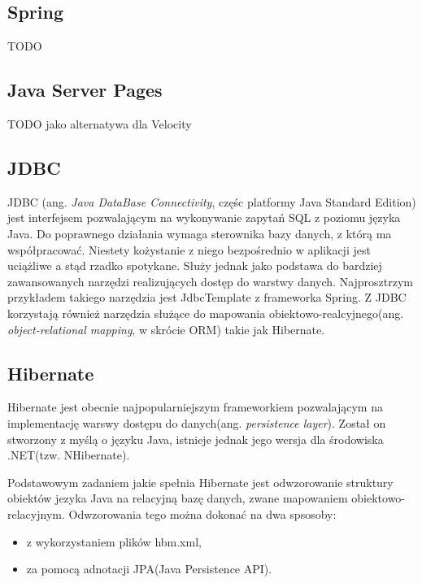 \subsection[Spring][Spring]{Spring}
TODO

\subsection[Java Server Pages][Java Server Pages]{Java Server Pages}
TODO jako alternatywa dla Velocity

\subsection[JDBC][JDBC]{JDBC}
JDBC (ang. \textit{Java DataBase Connectivity}, częśc platformy Java Standard Edition) jest interfejsem pozwalającym na wykonywanie zapytań SQL z poziomu języka Java. Do poprawnego działania wymaga sterownika bazy danych, z którą ma współpracować. Niestety kożystanie z niego bezpośrednio w aplikacji jest uciążliwe a stąd rzadko spotykane. Służy jednak jako podstawa do bardziej zawansowanych narzędzi realizujących dostęp do warstwy danych. Najprosztrzym przykładem takiego narzędzia jest JdbcTemplate z frameworka Spring. Z JDBC korzystają również narzędzia służące do mapowania obiektowo-realcyjnego(ang. \textit{object-relational mapping}, w skrócie ORM) takie jak Hibernate.

\subsection[Hibernate][Hibernate]{Hibernate}
Hibernate jest obecnie najpopularniejszym frameworkiem pozwalającym na implementację warswy dostępu do danych(ang. \textit{persistence layer}). Został on stworzony z myślą o języku Java, istnieje jednak jego wersja dla środowiska .NET(tzw. NHibernate).

Podstawowym zadaniem jakie spełnia Hibernate jest odwzorowanie struktury obiektów jezyka Java na relacyjną bazę danych, zwane mapowaniem obiektowo-relacyjnym. Odwzorowania tego można dokonać na dwa spsosoby:
\begin{itemize}
	\item z wykorzystaniem plików hbm.xml,
	\item za pomocą adnotacji JPA(Java Persistence API).
\end{itemize}

